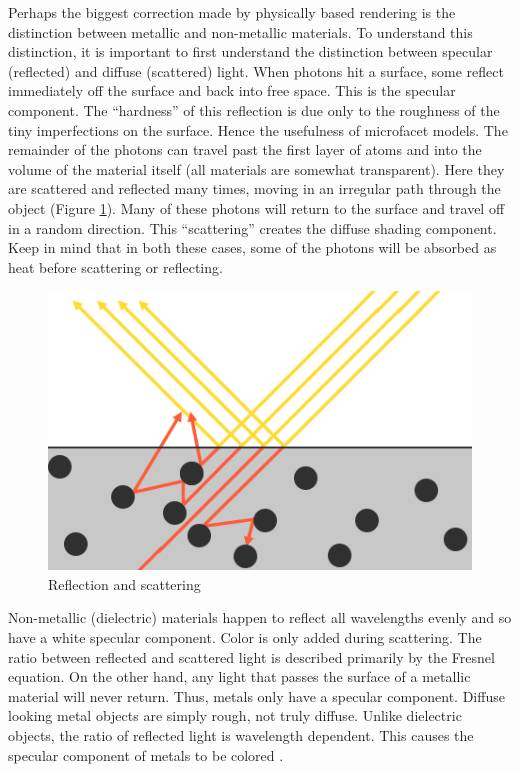 \documentclass[12pt, letterpaper, twocolumn]{article}
\begin{document}
Perhaps the biggest correction made by physically based rendering is the
distinction between metallic and non-metallic materials. To understand this
distinction, it is important to first understand the distinction between
specular (reflected) and diffuse (scattered) light. When photons hit a
surface, some reflect immediately off the surface and back into free space.
This is the specular component. The “hardness” of this reflection is due only
to the roughness of the tiny imperfections on the surface. Hence the
usefulness of microfacet models. The remainder of the photons can travel past
the first layer of atoms and into the volume of the material itself (all
materials are somewhat transparent). Here they are scattered and reflected
many times, moving in an irregular path through the object (Figure
\ref{refscat}). Many of these photons will return to the surface and travel
off in a random direction. This “scattering” creates the diffuse shading
component. Keep in mind that in both these cases, some of the photons will be
absorbed as heat before scattering or reflecting.

\begin{figure}
\centering \includegraphics[width=0.5 \textwidth]{surface_reaction.png}
\caption{Reflection and scattering}
\label{refscat}
\end{figure}

Non-metallic (dielectric) materials happen to reflect all wavelengths evenly
and so have a white specular component. Color is only added during scattering.
The ratio between reflected and scattered light is described primarily by the
Fresnel equation. On the other hand, any light that passes the surface of a
metallic material will never return. Thus, metals only have a specular
component. Diffuse looking metal objects are simply rough, not truly diffuse.
Unlike dielectric objects, the ratio of reflected light is wavelength
dependent. This causes the specular component of metals to be colored
\cite{CoTor}.
\end{document}
